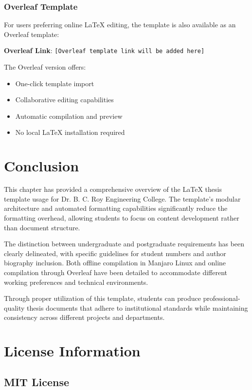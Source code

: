 \subsubsection{Overleaf Template}
For users preferring online LaTeX editing, the template is also available as an Overleaf template:

\textbf{Overleaf Link}: \texttt{[Overleaf template link will be added here]}

The Overleaf version offers:
\begin{itemize}
	\item One-click template import
	\item Collaborative editing capabilities
	\item Automatic compilation and preview
	\item No local LaTeX installation required
\end{itemize}

\section{Conclusion}
\label{sec:conclusion}

This chapter has provided a comprehensive overview of the LaTeX thesis template usage for Dr. B. C. Roy Engineering College. The template's modular architecture and automated formatting capabilities significantly reduce the formatting overhead, allowing students to focus on content development rather than document structure.

The distinction between undergraduate and postgraduate requirements has been clearly delineated, with specific guidelines for student numbers and author biography inclusion. Both offline compilation in Manjaro Linux and online compilation through Overleaf have been detailed to accommodate different working preferences and technical environments.

Through proper utilization of this template, students can produce professional-quality thesis documents that adhere to institutional standards while maintaining consistency across different projects and departments.

\section{License Information}
\label{sec:license}

\subsection{MIT License}
\label{subsec:mit_license}

